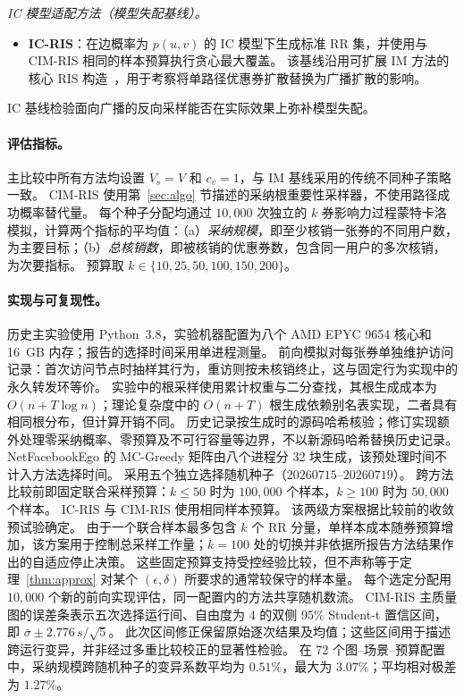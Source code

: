 \documentclass[sigconf,balance=false]{acmart}
\newcommand{\CIMRIS}{\textsc{CIM-RIS}}
\begin{document}
\noindent\textit{IC 模型适配方法（模型失配基线）。}
\begin{itemize}[leftmargin=*]
  \item \textbf{IC-RIS}：在边概率为 $p(u,v)$ 的 IC 模型下生成标准 RR 集，并使用与 \CIMRIS{} 相同的样本预算执行贪心最大覆盖。
  该基线沿用可扩展 IM 方法的核心 RIS 构造~\cite{borgs2014maximizing,tang2015influence}，用于考察将单路径优惠券扩散替换为广播扩散的影响。
\end{itemize}

IC 基线检验面向广播的反向采样能否在实际效果上弥补模型失配。

\paragraph{评估指标。}
主比较中所有方法均设置 $V_s=V$ 和 $c_v=1$，与 IM 基线采用的传统不同种子策略一致。
\CIMRIS{} 使用第~\ref{sec:algo} 节描述的采纳根重要性采样器，不使用路径成功概率替代量。
每个种子分配均通过 $10{,}000$ 次独立的 $k$ 券影响力过程蒙特卡洛模拟，计算两个指标的平均值：（a）\emph{采纳规模}，即至少核销一张券的不同用户数，为主要目标；（b）\emph{总核销数}，即被核销的优惠券数，包含同一用户的多次核销，为次要指标。
预算取 $k\in\{10,25,50,100,150,200\}$。

\paragraph{实现与可复现性。}
历史主实验使用 Python~3.8，实验机器配置为八个 AMD EPYC 9654 核心和 16~GB 内存；报告的选择时间采用单进程测量。
前向模拟对每张券单独维护访问记录：首次访问节点时抽样其行为，重访则按未核销终止，这与固定行为实现中的永久转发环等价。
实验中的根采样使用累计权重与二分查找，其根生成成本为 $O(n+T\log n)$；理论复杂度中的 $O(n+T)$ 根生成依赖别名表实现，二者具有相同根分布，但计算开销不同。
历史记录按生成时的源码哈希核验；修订实现额外处理零采纳概率、零预算及不可行容量等边界，不以新源码哈希替换历史记录。
NetFacebookEgo 的 MC-Greedy 矩阵由八个进程分 32 块生成，该预处理时间不计入方法选择时间。
采用五个独立选择随机种子（$20260715$--$20260719$）。
跨方法比较前即固定联合采样预算：$k\leq50$ 时为 $100{,}000$ 个样本，$k\geq100$ 时为 $50{,}000$ 个样本。
IC-RIS 与 \CIMRIS{} 使用相同样本预算。
该两级方案根据比较前的收敛预试验确定。
由于一个联合样本最多包含 $k$ 个 RR 分量，单样本成本随券预算增加，该方案用于控制总采样工作量；$k=100$ 处的切换并非依据所报告方法结果作出的自适应停止决策。
这些固定预算支持受控经验比较，但不声称等于定理~\ref{thm:approx} 对某个 $(\epsilon,\delta)$ 所要求的通常较保守的样本量。
每个选定分配用 $10{,}000$ 个新的前向实现评估，同一配置内的方法共享随机数流。
\CIMRIS{} 主质量图的误差条表示五次选择运行间、自由度为 4 的双侧 95\% Student-t 置信区间，即 $\bar\sigma\pm2.776\,s/\sqrt{5}$。
此次区间修正保留原始逐次结果及均值；这些区间用于描述跨运行变异，并非经过多重比较校正的显著性检验。
在 72 个图--场景--预算配置中，采纳规模跨随机种子的变异系数平均为 $0.51\%$，最大为 $3.07\%$；平均相对极差为 $1.27\%$。
\end{document}
